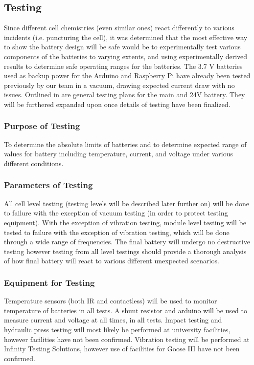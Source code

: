 \documentclass[main.tex]{subfiles}
\begin{document}
    \subsection{Testing}
    Since different cell chemistries (even similar ones) react differently to various incidents (i.e. puncturing the cell), it was determined that the most effective way to show the battery design will be safe would be to experimentally test various components of the batteries to varying  extents, and using experimentally derived results to determine safe operating ranges for the batteries. The 3.7 V batteries used as backup power for the Arduino and Raspberry Pi have already been tested previously by our team in a vacuum, drawing expected current draw with no issues. Outlined in  are general testing plans for the main and 24V battery. They will be furthered expanded upon once details of testing have been finalized.
    \subsubsection{Purpose of Testing}
    To determine the absolute limits of batteries and to determine expected range of values for battery including temperature, current, and voltage under various different conditions.
    \subsubsection{Parameters of Testing}
    All cell level testing (testing levels will be described later further on) will be done to failure with the exception of vacuum testing (in order to protect testing equipment). With the exception of vibration testing, module level testing will be tested to failure with the exception of vibration testing, which will be done through a wide range of frequencies. The final battery will undergo no destructive testing however testing from all level testings should provide a thorough analysis of how final battery will react to various different unexpected scenarios.
    \subsubsection{Equipment for Testing}
    Temperature sensors (both IR and contactless) will be used to monitor temperature of batteries in all tests. A shunt resistor and arduino will be used to measure current and voltage at all times, in all tests. Impact testing and hydraulic press testing will most likely be performed at university facilities, however facilities have not been confirmed. Vibration testing will be performed at Infinity Testing Solutions, however use of facilities for Goose III have not been confirmed.
\end{document}
